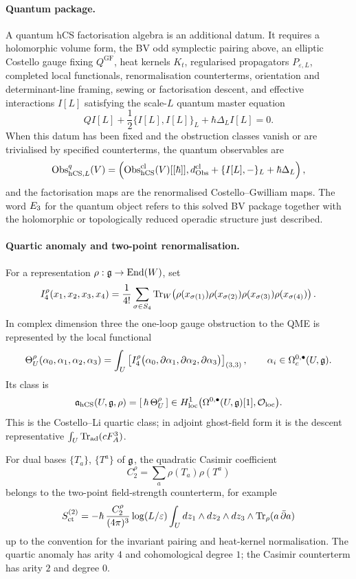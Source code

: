 \paragraph{Quantum package.}
A quantum hCS factorisation algebra is an additional datum. It requires
a holomorphic volume form, the BV odd symplectic pairing above, an
elliptic Costello gauge fixing \(Q^{\mathrm{GF}}\), heat kernels
\(K_t\), regularised propagators \(P_{\varepsilon,L}\), completed local
functionals, renormalisation counterterms, orientation and
determinant-line framing, sewing or factorisation descent, and
effective interactions \(I[L]\) satisfying the scale-\(L\) quantum
master equation
\[
  QI[L]+\frac12\{I[L],I[L]\}_L+\hbar\Delta_L I[L]=0 .
\]
When this datum has been fixed and the obstruction classes vanish or
are trivialised by specified counterterms, the quantum observables are
\[
  \mathrm{Obs}^q_{\mathrm{hCS},L}(V)
  =
  \left(
    \mathrm{Obs}^{\mathrm{cl}}_{\mathrm{hCS}}(V)[[\hbar]],
    d_{\mathrm{Obs}}^{\mathrm{cl}}+\{I[L],-\}_L+\hbar\Delta_L
  \right),
\]
and the factorisation maps are the renormalised Costello--Gwilliam
maps. The word \(E_3\) for the quantum object refers to this solved
BV package together with the holomorphic or topologically reduced
operadic structure just described.

\paragraph{Quartic anomaly and two-point renormalisation.}
For a representation \(\rho:\mathfrak{g}\to\operatorname{End}(W)\), set
\[
  I_4^\rho(x_1,x_2,x_3,x_4)
  =
  \frac1{4!}\sum_{\sigma\in S_4}
  \operatorname{Tr}_W\!\left(
    \rho(x_{\sigma(1)})\rho(x_{\sigma(2)})
    \rho(x_{\sigma(3)})\rho(x_{\sigma(4)})
  \right).
\]
In complex dimension three the one-loop gauge obstruction to the QME is
represented by the local functional
\[
  \Theta^\rho_U(\alpha_0,\alpha_1,\alpha_2,\alpha_3)
  =
  \int_U
  \left[
  I_4^\rho\bigl(
    \alpha_0,\partial\alpha_1,\partial\alpha_2,\partial\alpha_3
  \bigr)
  \right]_{(3,3)},
  \qquad
  \alpha_i\in\Omega_c^{0,\bullet}(U,\mathfrak{g}).
\]
Its class is
\[
  \mathfrak a_{\mathrm{hCS}}(U,\mathfrak{g},\rho)
  =
  [\,\hbar\,\Theta^\rho_U\,]
  \in
  H^1_{\mathrm{loc}}
  \bigl(\Omega^{0,\bullet}(U,\mathfrak{g})[1],\mathcal{O}_{\mathrm{loc}}\bigr).
\]
This is the Costello--Li quartic class; in adjoint ghost-field form it is
the descent representative \(\int_U\operatorname{Tr}_{\mathrm{ad}}(cF_A^3)\).

For dual bases \(\{T_a\}\), \(\{T^a\}\) of \(\mathfrak{g}\), the quadratic
Casimir coefficient
\[
  C_2^\rho=\sum_a\rho(T_a)\rho(T^a)
\]
belongs to the two-point field-strength counterterm, for example
\[
  S_{\mathrm{ct}}^{(2)}
  =
  -\hbar\,\frac{C_2^\rho}{(4\pi)^3}
  \log(L/\varepsilon)
  \int_U dz_1\wedge dz_2\wedge dz_3\wedge\operatorname{Tr}_\rho(a\,\bar\partial a)
\]
up to the convention for the invariant pairing and heat-kernel
normalisation. The quartic anomaly has arity \(4\) and cohomological
degree \(1\); the Casimir counterterm has arity \(2\) and degree \(0\).

